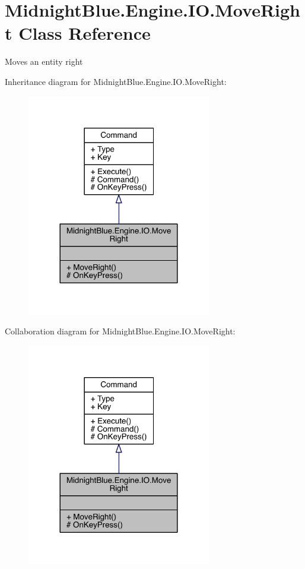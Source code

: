 \hypertarget{class_midnight_blue_1_1_engine_1_1_i_o_1_1_move_right}{}\section{Midnight\+Blue.\+Engine.\+I\+O.\+Move\+Right Class Reference}
\label{class_midnight_blue_1_1_engine_1_1_i_o_1_1_move_right}


Moves an entity right  




Inheritance diagram for Midnight\+Blue.\+Engine.\+I\+O.\+Move\+Right\+:
\nopagebreak
\begin{figure}[H]
\begin{center}
\leavevmode
\includegraphics[width=228pt]{class_midnight_blue_1_1_engine_1_1_i_o_1_1_move_right__inherit__graph}
\end{center}
\end{figure}


Collaboration diagram for Midnight\+Blue.\+Engine.\+I\+O.\+Move\+Right\+:
\nopagebreak
\begin{figure}[H]
\begin{center}
\leavevmode
\includegraphics[width=228pt]{class_midnight_blue_1_1_engine_1_1_i_o_1_1_move_right__coll__graph}
\end{center}
\end{figure}
